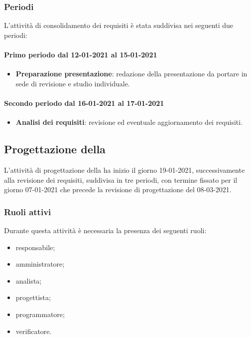 \subsubsection{Periodi} 
L'attività di consolidamento dei requisiti è stata suddivisa nei seguenti due periodi: 

\paragraph{Primo periodo dal 12-01-2021 al 15-01-2021} 
\begin{itemize} 
	
	\item \textbf{Preparazione presentazione}: redazione della presentazione da portare in sede di revisione e studio individuale. 
	
\end{itemize}	 

\paragraph{Secondo periodo dal 16-01-2021 al 17-01-2021} 
\begin{itemize} 
	
	\item \textbf{Analisi dei requisiti}: revisione ed eventuale aggiornamento dei requisiti. 
	
\end{itemize} 

\newpage 


\newpage 
\subsection{Progettazione della } 
L'attività di progettazione della  ha inizio il giorno 19-01-2021, successivamente alla revisione dei requisiti, suddivisa in tre periodi, con termine fissato per il giorno 07-01-2021 che precede la revisione di progettazione del 08-03-2021. 

\subsubsection{Ruoli attivi} 
Durante questa attività è necessaria la presenza dei seguenti ruoli: 
\begin{itemize} 
	\item responsabile; 
	\item amministratore; 
	\item analista; 
	\item progettista; 
	\item programmatore; 
	\item verificatore.
\end{itemize} 

